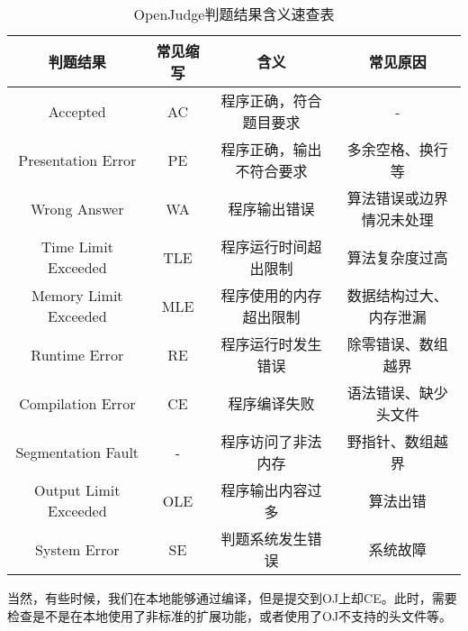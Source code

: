 \begin{table}[ht]\small
  \centering
  \begin{tabular}{cccc}
    \toprule
    判题结果 & 常见缩写 & 含义 & 常见原因 \\
    \midrule
    Accepted & AC & 程序正确，符合题目要求 & - \\
    Presentation Error & PE & 程序正确，输出不符合要求 & 多余空格、换行等 \\
    \midrule
    Wrong Answer & WA & 程序输出错误 & 算法错误或边界情况未处理 \\
    Time Limit Exceeded & TLE & 程序运行时间超出限制 & 算法复杂度过高 \\
    Memory Limit Exceeded & MLE & 程序使用的内存超出限制 & 数据结构过大、内存泄漏 \\
    Runtime Error & RE & 程序运行时发生错误 & 除零错误、数组越界 \\
    Compilation Error & CE & 程序编译失败 & 语法错误、缺少头文件 \\
    Segmentation Fault & - & 程序访问了非法内存 & 野指针、数组越界 \\
    Output Limit Exceeded & OLE & 程序输出内容过多 & 算法出错 \\
    \midrule
    System Error & SE & 判题系统发生错误 & 系统故障 \\
    \bottomrule
  \end{tabular}
  \caption{OpenJudge判题结果含义速查表}
  \label{tab:oj_results}
\end{table}

当然，有些时候，我们在本地能够通过编译，但是提交到OJ上却CE。此时，需要检查是不是在本地使用了非标准的扩展功能，或者使用了OJ不支持的头文件等。
